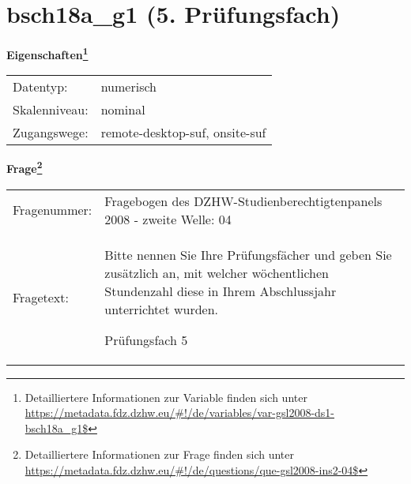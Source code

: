 
    \setcounter{footnote}{0}

    \vspace*{-1.8cm}
	\section{bsch18a\_g1 (5. Prüfungsfach)}
	\label{section:bsch18a_g1}



    \vspace*{0.5cm}
    \noindent\textbf{Eigenschaften\footnote{Detailliertere Informationen zur Variable finden sich unter
		\url{https://metadata.fdz.dzhw.eu/\#!/de/variables/var-gsl2008-ds1-bsch18a_g1$}}}\\
	\begin{tabularx}{\hsize}{@{}lX}
	Datentyp: & numerisch \\
	Skalenniveau: & nominal \\
	Zugangswege: &
	  remote-desktop-suf, 
	  onsite-suf
 \\
    \end{tabularx}



				\vspace*{0.5cm}
                \noindent\textbf{Frage\footnote{Detailliertere Informationen zur Frage finden sich unter
		              \url{https://metadata.fdz.dzhw.eu/\#!/de/questions/que-gsl2008-ins2-04$}}}\\
				\begin{tabularx}{\hsize}{@{}lX}
					Fragenummer: &
					  Fragebogen des DZHW-Studienberechtigtenpanels 2008 - zweite Welle:
					  04
 \\
					Fragetext: & Bitte nennen Sie Ihre Prüfungsfächer und geben Sie zusätzlich an, mit welcher wöchentlichen Stundenzahl diese in Ihrem Abschlussjahr unterrichtet wurden.\par  Prüfungsfach 5 \\
				\end{tabularx}





